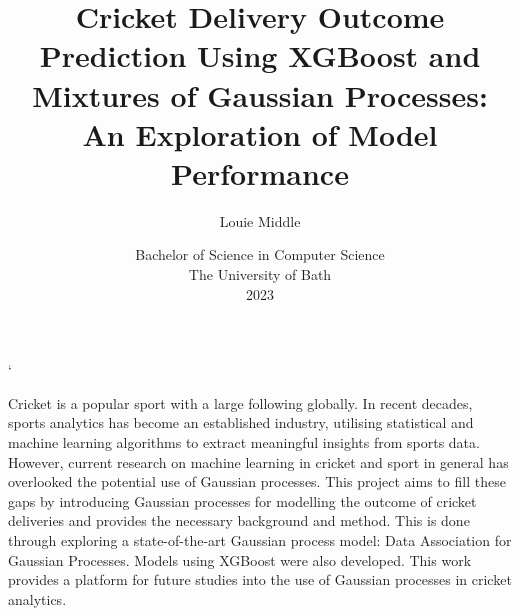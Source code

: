 \documentclass[12pt,a4paper]{report}
\title{\bf Cricket Delivery Outcome Prediction Using XGBoost and Mixtures of Gaussian Processes: An Exploration of Model Performance}
\author{Louie Middle}
\date{Bachelor of Science in Computer Science\\ 
      The University of Bath\\
      2023}
\theoremstyle{definition}
\begin{document}
\hypersetup{pageanchor=false}	



\lstMakeShortInline`

\setcounter{page}{0}

\maketitle
\newpage

\newpage

\newpage

\hypersetup{pageanchor=true}

\abstract
Cricket is a popular sport with a large following globally. In recent decades, sports analytics has become an established industry, utilising statistical and machine learning algorithms to extract meaningful insights from sports data. 
However, current research on machine learning in cricket and sport in general has overlooked the potential use of Gaussian processes. 
This project aims to fill these gaps by introducing Gaussian processes for modelling the outcome of cricket deliveries and provides the necessary background and method. 
This is done through exploring a state-of-the-art Gaussian process model: Data Association for Gaussian Processes.
Models using XGBoost were also developed.
This work provides a platform for future studies into the use of Gaussian processes in cricket analytics.
\newpage
\end{document}
